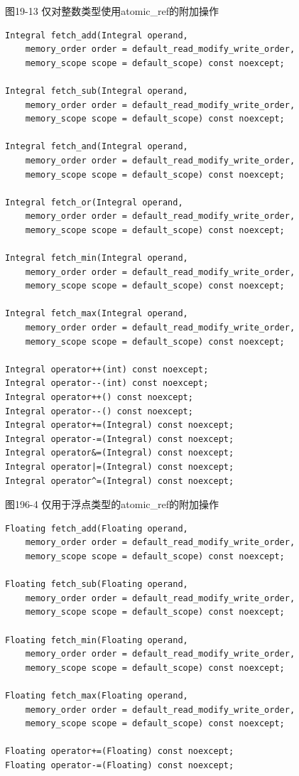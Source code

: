\hspace*{\fill} \par %
图19-13 仅对整数类型使用atomic\_ref的附加操作
\begin{lstlisting}[caption={}]
Integral fetch_add(Integral operand,
	memory_order order = default_read_modify_write_order,
	memory_scope scope = default_scope) const noexcept;
	
Integral fetch_sub(Integral operand,
	memory_order order = default_read_modify_write_order,
	memory_scope scope = default_scope) const noexcept;
	
Integral fetch_and(Integral operand,
	memory_order order = default_read_modify_write_order,
	memory_scope scope = default_scope) const noexcept;
	
Integral fetch_or(Integral operand,
	memory_order order = default_read_modify_write_order,
	memory_scope scope = default_scope) const noexcept;
	
Integral fetch_min(Integral operand,
	memory_order order = default_read_modify_write_order,
	memory_scope scope = default_scope) const noexcept;

Integral fetch_max(Integral operand,
	memory_order order = default_read_modify_write_order,
	memory_scope scope = default_scope) const noexcept;

Integral operator++(int) const noexcept;
Integral operator--(int) const noexcept;
Integral operator++() const noexcept;
Integral operator--() const noexcept;
Integral operator+=(Integral) const noexcept;
Integral operator-=(Integral) const noexcept;
Integral operator&=(Integral) const noexcept;
Integral operator|=(Integral) const noexcept;
Integral operator^=(Integral) const noexcept;
\end{lstlisting}

\hspace*{\fill} \par %
图196-4 仅用于浮点类型的atomic\_ref的附加操作
\begin{lstlisting}[caption={}]
Floating fetch_add(Floating operand,
	memory_order order = default_read_modify_write_order,
	memory_scope scope = default_scope) const noexcept;
	
Floating fetch_sub(Floating operand,
	memory_order order = default_read_modify_write_order,
	memory_scope scope = default_scope) const noexcept;
	
Floating fetch_min(Floating operand,
	memory_order order = default_read_modify_write_order,
	memory_scope scope = default_scope) const noexcept;
	
Floating fetch_max(Floating operand,
	memory_order order = default_read_modify_write_order,
	memory_scope scope = default_scope) const noexcept;
	
Floating operator+=(Floating) const noexcept;
Floating operator-=(Floating) const noexcept;
\end{lstlisting}

